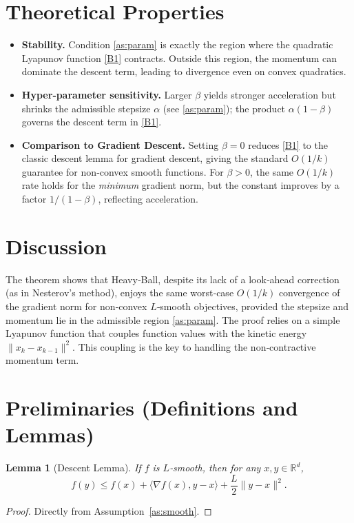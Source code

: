 \documentclass{article}
\newtheorem{lemma}{Lemma}[section]
\newcommand{\grad}{\nabla}
\begin{document}
\section*{Theoretical Properties}
\begin{itemize}
\item \textbf{Stability.} Condition \eqref{as:param} is exactly the region where the quadratic Lyapunov function \eqref{B1} contracts.  Outside this region, the momentum can dominate the descent term, leading to divergence even on convex quadratics.
\item \textbf{Hyper‑parameter sensitivity.} Larger $\beta$ yields stronger acceleration but shrinks the admissible stepsize $\alpha$ (see \eqref{as:param}); the product $\alpha(1-\beta)$ governs the descent term in \eqref{B1}.
\item \textbf{Comparison to Gradient Descent.} Setting $\beta=0$ reduces \eqref{B1} to the classic descent lemma for gradient descent, giving the standard $O(1/k)$ guarantee for non‑convex smooth functions.  For $\beta>0$, the same $O(1/k)$ rate holds for the \emph{minimum} gradient norm, but the constant improves by a factor $1/(1-\beta)$, reflecting acceleration.
\end{itemize}

\section*{Discussion}
The theorem shows that Heavy‑Ball, despite its lack of a look‑ahead correction (as in Nesterov’s method), enjoys the same worst‑case $O(1/k)$ convergence of the gradient norm for non‑convex $L$‑smooth objectives, provided the stepsize and momentum lie in the admissible region \eqref{as:param}.  The proof relies on a simple Lyapunov function that couples function values with the kinetic energy $\|x_k-x_{k-1}\|^2$.  This coupling is the key to handling the non‑contractive momentum term.

\newpage
\section*{Preliminaries (Definitions and Lemmas)}
\begin{lemma}[Descent Lemma]\label{lem:descent}
If $f$ is $L$‑smooth, then for any $x,y\in\mathbb{R}^d$,
\[
f(y)\le f(x)+\langle\grad f(x),y-x\rangle+\frac{L}{2}\|y-x\|^2 .
\tag{C1}
\]
\end{lemma}
\begin{proof}
Directly from Assumption~\ref{as:smooth}. \qedhere
\end{proof}
\end{document}
